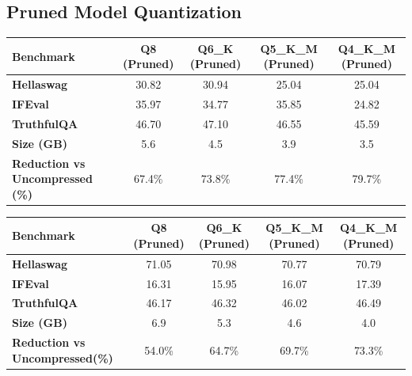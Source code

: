 \documentclass{ifacconf}
\begin{document}
    \vfill
    \clearpage
    \pagebreak

    \subsection{Pruned Model Quantization}
    \begin{strip}
		\begin{minipage}{\textwidth}
           \begin{table}[H]
            \centering
            \begin{tabular}{|l|c|c|c|c|}
                \hline
                \textbf{Benchmark} & \textbf{Q8 (Pruned)} & \textbf{Q6\_K (Pruned)} & \textbf{Q5\_K\_M (Pruned)} & \textbf{Q4\_K\_M (Pruned)} \\ \hline
                \textbf{Hellaswag} & 30.82 & 30.94 & 25.04 & 25.04 \\ \hline
                \textbf{IFEval}    & 35.97 & 34.77 & 35.85 & 24.82 \\ \hline
                \textbf{TruthfulQA} & 46.70 & 47.10 & 46.55 & 45.59 \\ \hline
                \textbf{Size (GB)} & 5.6 & 4.5 & 3.9 & 3.5 \\ \hline
                \textbf{Reduction vs Uncompressed (\%)} & 67.4\% & 73.8\% & 77.4\% & 79.7\% \\ \hline
            \end{tabular}
            \label{tab:gemma_pruned_quantized}
            \end{table}

            \begin{table}[H]
                \centering
                \begin{tabular}{|l|c|c|c|c|}
                    \hline
                    \textbf{Benchmark} & \textbf{Q8 (Pruned)} & \textbf{Q6\_K (Pruned)} & \textbf{Q5\_K\_M (Pruned)} & \textbf{Q4\_K\_M (Pruned)} \\ \hline
                    \textbf{Hellaswag} & 71.05 & 70.98 & 70.77 & 70.79 \\ \hline
                    \textbf{IFEval}    & 16.31 & 15.95 & 16.07 & 17.39 \\ \hline
                    \textbf{TruthfulQA} & 46.17 & 46.32 & 46.02 & 46.49 \\ \hline
                    \textbf{Size (GB)} & 6.9 & 5.3 & 4.6 & 4.0 \\ \hline
                    \textbf{Reduction vs Uncompressed(\%)} & 54.0\% & 64.7\% & 69.7\% & 73.3\% \\ \hline
                \end{tabular}
                \label{tab:llama_pruned_quantized}
            \end{table}


\end{minipage}
\end{strip}
\end{document}
